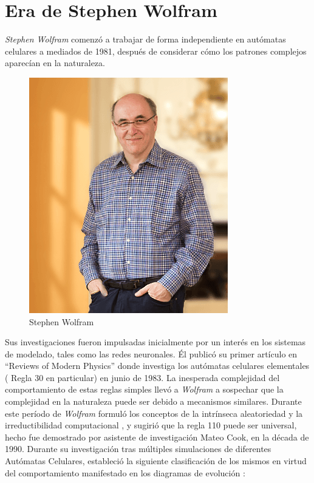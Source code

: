 \section{Era de Stephen Wolfram} %
\textit{Stephen Wolfram} comenzó a trabajar de forma independiente en autómatas celulares a mediados de 1981, después de considerar cómo los patrones complejos aparecían en la naturaleza. 
\begin{figure}
\centering
\includegraphics[scale=0.3]{imagenes/stephen.png}
\caption{Stephen Wolfram}
\label{fig:Stephen}
\end{figure}
Sus investigaciones fueron impulsadas inicialmente por un interés en los sistemas de modelado, tales como las redes neuronales. Él publicó su primer artículo en ``Reviews of Modern Physics'' donde investiga los autómatas celulares elementales ( Regla 30 en particular) en junio de 1983. La inesperada complejidad del comportamiento de estas reglas simples llevó a \textit{Wolfram} a sospechar que la complejidad en la naturaleza puede ser debido a mecanismos similares. Durante este período de \textit{Wolfram} formuló los conceptos de la intrínseca aleatoriedad y la irreductibilidad computacional , y sugirió que la regla 110 puede ser universal, hecho fue demostrado por asistente de investigación Mateo Cook, en la década de 1990. Durante su investigación tras múltiples simulaciones de diferentes Autómatas Celulares, estableció la siguiente clasificación de los mismos en virtud del comportamiento manifestado en los diagramas de evolución \cite{wolfram}:
